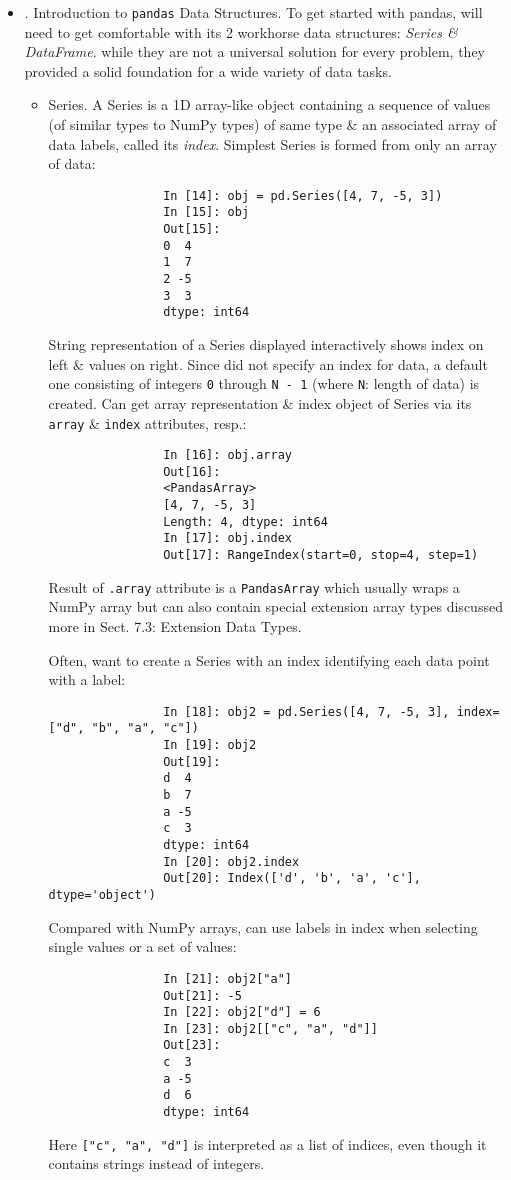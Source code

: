 \documentclass{article}
\begin{document}
\begin{itemize}
	\begin{itemize}
		\item {. Introduction to {\tt pandas} Data Structures.} To get started with pandas, will need to get comfortable with its 2 workhorse data structures: {\it Series \& DataFrame}. while they are not a universal solution for every problem, they provided a solid foundation for a wide variety of data tasks.
		\begin{itemize}
			\item {\sf Series.} A Series is a 1D array-like object containing a sequence of values (of similar types to NumPy types) of same type \& an associated array of data labels, called its {\it index}. Simplest Series is formed from only an array of data:
			\begin{verbatim}
				In [14]: obj = pd.Series([4, 7, -5, 3])
				In [15]: obj
				Out[15]:
				0  4
				1  7
				2 -5
				3  3
				dtype: int64
			\end{verbatim}
			String representation of a Series displayed interactively shows index on left \& values on right. Since did not specify an index for data, a default one consisting of integers {\tt0} through {\tt N - 1} (where {\tt N}: length of data) is created. Can get array representation \& index object of Series via its {\tt array} \& {\tt index} attributes, resp.:
			\begin{verbatim}
				In [16]: obj.array
				Out[16]:
				<PandasArray>
				[4, 7, -5, 3]
				Length: 4, dtype: int64
				In [17]: obj.index
				Out[17]: RangeIndex(start=0, stop=4, step=1)
			\end{verbatim}
			Result of {\tt.array} attribute is a {\tt PandasArray} which usually wraps a NumPy array but can also contain special extension array types discussed more in Sect. 7.3: Extension Data Types.
			
			Often, want to create a Series with an index identifying each data point with a label:
			\begin{verbatim}
				In [18]: obj2 = pd.Series([4, 7, -5, 3], index=["d", "b", "a", "c"])
				In [19]: obj2
				Out[19]:
				d  4
				b  7
				a -5
				c  3
				dtype: int64
				In [20]: obj2.index
				Out[20]: Index(['d', 'b', 'a', 'c'], dtype='object')
			\end{verbatim}
			Compared with NumPy arrays, can use labels in index when selecting single values or a set of values:
			\begin{verbatim}
				In [21]: obj2["a"]
				Out[21]: -5
				In [22]: obj2["d"] = 6
				In [23]: obj2[["c", "a", "d"]]
				Out[23]:
				c  3
				a -5
				d  6
				dtype: int64
			\end{verbatim}
			Here {\tt["c", "a", "d"]} is interpreted as a list of indices, even though it contains strings instead of integers.
			

\end{itemize}
\end{itemize}
\end{itemize}
\end{document}
